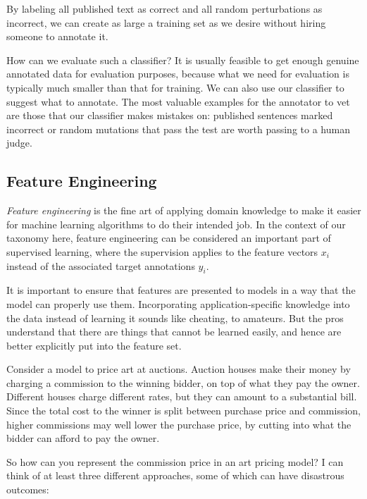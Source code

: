 \documentclass[10pt]{article}
\begin{document}
\begin{enumerate}
By labeling all published text as correct and all random perturbations as incorrect, we can create as large a training set as we desire without hiring someone to annotate it.

How can we evaluate such a classifier? It is usually feasible to get enough genuine annotated data for evaluation purposes, because what we need for evaluation is typically much smaller than that for training. We can also use our classifier to suggest what to annotate. The most valuable examples for the annotator to vet are those that our classifier makes mistakes on: published sentences marked incorrect or random mutations that pass the test are worth passing to a human judge.

\subsection{Feature Engineering}
\textit{Feature engineering} is the fine art of applying domain knowledge to make it easier for machine learning algorithms to do their intended job. In the context of our taxonomy here, feature engineering can be considered an important part of supervised learning, where the supervision applies to the feature vectors $x_{i}$ instead of the associated target annotations $y_{i}$.

It is important to ensure that features are presented to models in a way that the model can properly use them. Incorporating application-specific knowledge into the data instead of learning it sounds like cheating, to amateurs. But the pros understand that there are things that cannot be learned easily, and hence are better explicitly put into the feature set.

Consider a model to price art at auctions. Auction houses make their money by charging a commission to the winning bidder, on top of what they pay the owner. Different houses charge different rates, but they can amount to a substantial bill. Since the total cost to the winner is split between purchase price and commission, higher commissions may well lower the purchase price, by cutting into what the bidder can afford to pay the owner.

So how can you represent the commission price in an art pricing model? I can think of at least three different approaches, some of which can have disastrous outcomes:


\end{enumerate}
\end{document}

